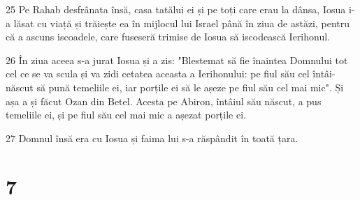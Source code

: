 \par 25 Pe Rahab desfrânata însă, casa tatălui ei și pe toți care erau la dânsa, Iosua i-a lăsat cu viață și trăiește ea în mijlocul lui Israel până în ziua de astăzi, pentru că a ascuns iscoadele, care fuseseră trimise de Iosua să iscodească Ierihonul.
\par 26 În ziua aceea s-a jurat Iosua și a zis: "Blestemat să fie înaintea Domnului tot cel ce se va scula și va zidi cetatea aceasta a Ierihonului: pe fiul său cel întâi-născut să pună temeliile ei, iar porțile ei să le așeze pe fiul său cel mai mic". Și așa a și făcut Ozan din Betel. Acesta pe Abiron, întâiul său născut, a pus temeliile ei, și pe fiul său cel mai mic a așezat porțile ei.
\par 27 Domnul însă era cu Iosua și faima lui s-a răspândit în toată țara.

\chapter{7}

